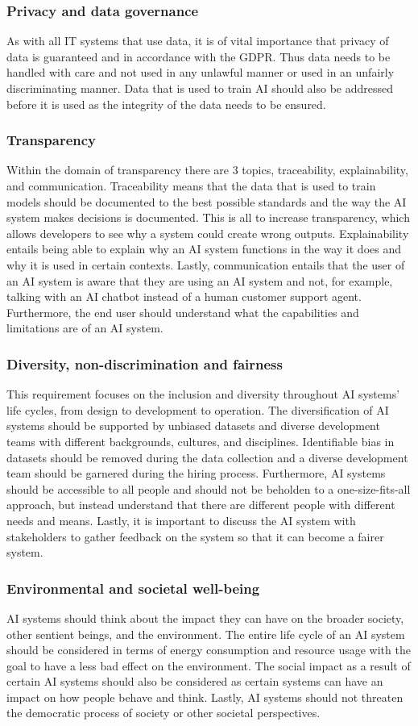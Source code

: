 \subsubsection*{Privacy and data governance}
As with all IT systems that use data, it is of vital importance that privacy of data is guaranteed and in accordance with the GDPR. Thus data needs to be handled with care and not used in any unlawful manner or used in an unfairly discriminating manner. Data that is used to train AI should also be addressed before it is used as the integrity of the data needs to be ensured.
\subsubsection*{Transparency}
Within the domain of transparency there are 3 topics, traceability, explainability, and communication. Traceability means that the data that is used to train models should be documented to the best possible standards and the way the AI system makes decisions is documented. This is all to increase transparency, which allows developers to see why a system could create wrong outputs. Explainability entails being able to explain why an AI system functions in the way it does and why it is used in certain contexts. Lastly, communication entails that the user of an AI system is aware that they are using an AI system and not, for example, talking with an AI chatbot instead of a human customer support agent. Furthermore, the end user should understand what the capabilities and limitations are of an AI system.
\subsubsection*{Diversity, non-discrimination and fairness}
This requirement focuses on the inclusion and diversity throughout AI systems’ life cycles, from design to development to operation. The diversification of AI systems should be supported by unbiased datasets and diverse development teams with different backgrounds, cultures, and disciplines. Identifiable bias in datasets should be removed during the data collection and a diverse development team should be garnered during the hiring process. Furthermore, AI systems should be accessible to all people and should not be beholden to a one-size-fits-all approach, but instead understand that there are different people with different needs and means. Lastly, it is important to discuss the AI system with stakeholders to gather feedback on the system so that it can become a fairer system.
\subsubsection*{Environmental and societal well-being}
AI systems should think about the impact they can have on the broader society, other sentient beings, and the environment. The entire life cycle of an AI system should be considered in terms of energy consumption and resource usage with the goal to have a less bad effect on the environment. The social impact as a result of certain AI systems should also be considered as certain systems can have an impact on how people behave and think. Lastly, AI systems should not threaten the democratic process of society or other societal perspectives.

